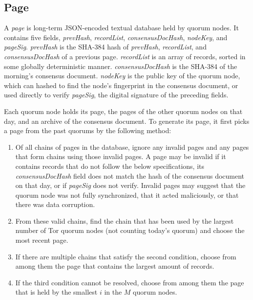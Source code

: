 \subsection{Page}

A \textit{page} is long-term JSON-encoded textual database held by quorum nodes. It contains five fields, \textit{prevHash}, \textit{recordList}, \textit{consensusDocHash}, \textit{nodeKey}, and \textit{pageSig}. \textit{prevHash} is the SHA-384 hash of \textit{prevHash}, \textit{recordList}, and \textit{consensusDocHash} of a previous page. \textit{recordList} is an array of records, sorted in some globally deterministic manner. \textit{consensusDocHash} is the SHA-384 of the morning's consensus document. \textit{nodeKey} is the public key of the quorum node, which can hashed to find the node's fingerprint in the consensus document, or used directly to verify \textit{pageSig}, the digital signature of the preceding fields.

Each quorum node holds its page, the pages of the other quorum nodes on that day, and an archive of the consensus document. To generate its page, it first picks a page from the past quorums by the following method:


\begin{enumerate}
	\item Of all chains of pages in the database, ignore any invalid pages and any pages that form chains using those invalid pages. A page may be invalid if it contains records that do not follow the below specifications, its \textit{consensusDocHash} field does not match the hash of the consensus document on that day, or if \textit{pageSig} does not verify. Invalid pages may suggest that the quorum node was not fully synchronized, that it acted maliciously, or that there was data corruption.
	\item From these valid chains, find the chain that has been used by the largest number of Tor quorum nodes (not counting today's quorum) and choose the most recent page.
	\item If there are multiple chains that satisfy the second condition, choose from among them the page that contains the largest amount of records.
	\item If the third condition cannot be resolved, choose from among them the page that is held by the smallest $ i $ in the $ M $ quorum nodes.
\end{enumerate}

